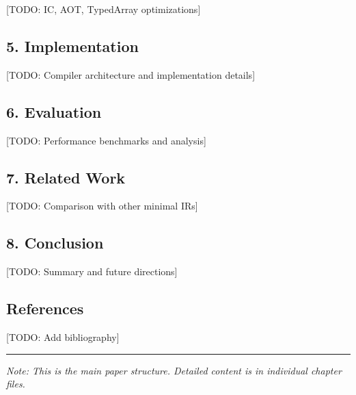 \documentclass[
]{article}
\begin{document}
{[}TODO: IC, AOT, TypedArray optimizations{]}

\hypertarget{implementation}{%
\subsection{5. Implementation}\label{implementation}}

{[}TODO: Compiler architecture and implementation details{]}

\hypertarget{evaluation}{%
\subsection{6. Evaluation}\label{evaluation}}

{[}TODO: Performance benchmarks and analysis{]}

\hypertarget{related-work}{%
\subsection{7. Related Work}\label{related-work}}

{[}TODO: Comparison with other minimal IRs{]}

\hypertarget{conclusion}{%
\subsection{8. Conclusion}\label{conclusion}}

{[}TODO: Summary and future directions{]}

\hypertarget{references}{%
\subsection{References}\label{references}}

{[}TODO: Add bibliography{]}

\begin{center}\rule{0.5\linewidth}{0.5pt}\end{center}

\emph{Note: This is the main paper structure. Detailed content is in
individual chapter files.}
\end{document}

